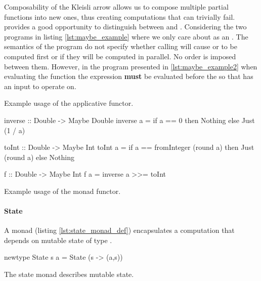   Composability of the Kleisli arrow allows us to compose multiple
  partial functions into new ones, thus creating computations that can
  trivially fail.  provides a good opportunity to
  distinguish between  and . Considering
  the two programs in listing \ref{lst:maybe_example} where we only care
  about  as an . The semantics of the
  program do not specify whether calling  will cause
   or  to be computed first or if they
  will be computed in parallel. No order is imposed between
  them. However, in the program presented in \ref{lst:maybe_example2}
  when evaluating the function  the expression 
  \textbf{must} be evaluated before the  so that
   has an input to operate on.

  \begin{code}
    \caption{\label{lst:maybe_example}Example usage of the 
      applicative functor.}
  \end{code}

  \begin{code}
\begin{haskellcode}
inverse :: Double -> Maybe Double
inverse a = if a == 0 then Nothing else Just (1 / a)

toInt :: Double -> Maybe Int
toInt a =
  if a == fromInteger (round a)
    then Just (round a)
    else Nothing

f :: Double -> Maybe Int
f a = inverse a >>= toInt
\end{haskellcode}
    \caption{\label{lst:maybe_example2}Example usage of the  monad functor.}
  \end{code}

  \paragraph{State}

  A  monad (listing \ref{lst:state_monad_def}) encapsulates
  a computation that depends on mutable state of type .

  \begin{code}
\begin{haskellcode}
newtype State s a = State (s -> (a,s))
\end{haskellcode}

    \caption{\label{lst:state_monad_def}The state monad describes
      mutable state.}
  \end{code}

